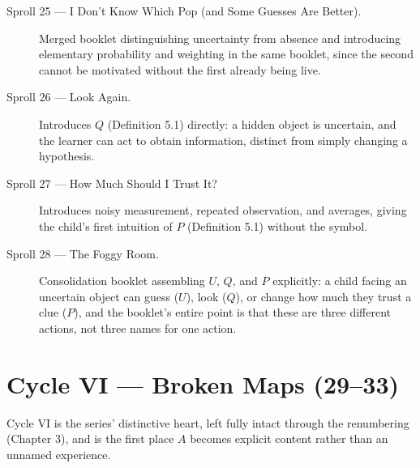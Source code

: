 \documentclass[11pt,twoside]{book}
\begin{document}
\begin{description}
\item[Sproll 25 --- I Don't Know Which Pop (and Some Guesses Are Better).] Merged booklet distinguishing uncertainty from absence and introducing elementary probability and weighting in the same booklet, since the second cannot be motivated without the first already being live.
\item[Sproll 26 --- Look Again.] Introduces $Q$ (Definition 5.1) directly: a hidden object is uncertain, and the learner can act to obtain information, distinct from simply changing a hypothesis.
\item[Sproll 27 --- How Much Should I Trust It?] Introduces noisy measurement, repeated observation, and averages, giving the child's first intuition of $P$ (Definition 5.1) without the symbol.
\item[Sproll 28 --- The Foggy Room.] Consolidation booklet assembling $U$, $Q$, and $P$ explicitly: a child facing an uncertain object can guess ($U$), look ($Q$), or change how much they trust a clue ($P$), and the booklet's entire point is that these are three different actions, not three names for one action.
\end{description}

\chapter{Cycle VI --- Broken Maps (29--33)}

Cycle VI is the series' distinctive heart, left fully intact through the renumbering (Chapter 3), and is the first place $A$ becomes explicit content rather than an unnamed experience.
\end{document}
